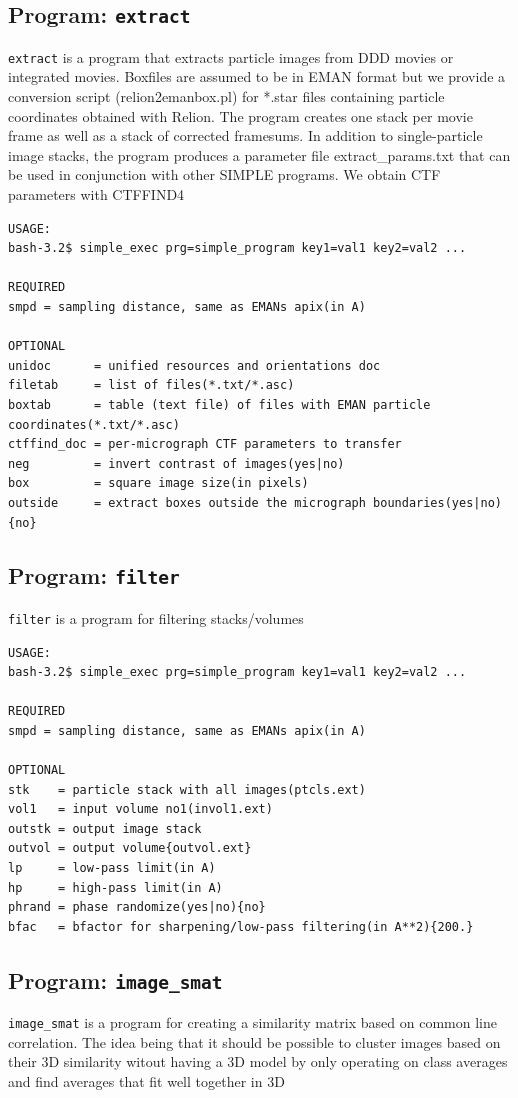 \documentclass[a4paper,11pt]{article}
\newcommand{\prgname}[1]{\textcolor{NavyBlue}{\texttt{#1}}}
\begin{document}
\subsection{Program: \prgname{extract}}
\label{extract}
\prgname{extract} is a program that extracts particle images from DDD movies or integrated movies. Boxfiles are assumed to be in EMAN format but we provide a conversion script (relion2emanbox.pl) for *.star files containing particle coordinates obtained with Relion. The program creates one stack per movie frame as well as a stack of corrected framesums. In addition to single-particle image stacks, the program produces a parameter file extract\_params.txt that can be used in conjunction with other SIMPLE programs. We obtain CTF parameters with CTFFIND4

\begin{verbatim}
USAGE:
bash-3.2$ simple_exec prg=simple_program key1=val1 key2=val2 ...

REQUIRED
smpd = sampling distance, same as EMANs apix(in A)

OPTIONAL
unidoc      = unified resources and orientations doc
filetab     = list of files(*.txt/*.asc)
boxtab      = table (text file) of files with EMAN particle coordinates(*.txt/*.asc)
ctffind_doc = per-micrograph CTF parameters to transfer
neg         = invert contrast of images(yes|no)
box         = square image size(in pixels)
outside     = extract boxes outside the micrograph boundaries(yes|no){no}
\end{verbatim}

\subsection{Program: \prgname{filter}}
\label{filter}
\prgname{filter} is a program for filtering stacks/volumes 

\begin{verbatim}
USAGE:
bash-3.2$ simple_exec prg=simple_program key1=val1 key2=val2 ...

REQUIRED
smpd = sampling distance, same as EMANs apix(in A)

OPTIONAL
stk    = particle stack with all images(ptcls.ext)
vol1   = input volume no1(invol1.ext)
outstk = output image stack
outvol = output volume{outvol.ext}
lp     = low-pass limit(in A)
hp     = high-pass limit(in A)
phrand = phase randomize(yes|no){no}
bfac   = bfactor for sharpening/low-pass filtering(in A**2){200.}
\end{verbatim}

\subsection{Program: \prgname{image\_smat}}
\label{image_smat}
\prgname{image\_smat} is a program for creating a similarity matrix based on common line correlation. The idea being that it should be possible to cluster images based on their 3D similarity witout having a 3D model by only operating on class averages and find averages that fit well together in 3D
\end{document}
